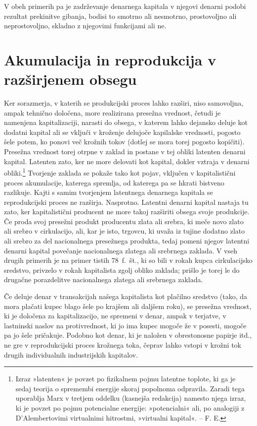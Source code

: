 \documentclass[kapital_02.tex]{subfiles}
\begin{document}
V obeh primerih pa je zadrževanje denarnega kapitala v njegovi denarni podobi rezultat prekinitve gibanja, bodisi to smotrno ali nesmotrno, prostovoljno ali neprostovoljno, skladno z njegovimi funkcijami ali ne.

\section{Akumulacija in reprodukcija v razširjenem obsegu}

Ker sorazmerja, v katerih se produkcijski proces lahko razširi, niso samovoljna, ampak tehnično določena, more realizirana presežna vrednost, četudi je namenjena kapitalizaciji, narasti do obsega, v katerem lahko dejansko deluje kot \KPEstran dodatni kapital ali se vključi v kroženje delujoče kapilalske vrednosti, pogosto šele potem, ko ponovi več krožnih tokov (dotlej se mora torej pogosto kopičiti). Presežna vrednost torej otrpne v zaklad in postane v tej obliki latenten denarni kapital. Latenten zato, ker ne more delovati kot kapital, dokler vztraja v denarni obliki.\footnote{Izraz »latenten« je povzet po fizikalnem pojmu latentne toplote, ki ga je sedaj teorija o spremembi energije skoraj popolnoma odpravila. Zaradi tega uporablja Marx v tretjem oddelku (kasnejša redakcija) namesto njega izraz, ki je povzet po pojmu potencialne energije: »potencialni« ali, po analogiji z D'Alembertovimi virtualnimi hitrostmi, »virtualni kapital«. -- F. E.} Tvorjenje zaklada se pokaže tako kot pojav, vključen v kapitalistični proces akumulacije, katerega spremlja, od katerega pa se hkrati bistveno razlikuje. Kajti s samim tvorjenjem latentnega denarnega kapitala se reprodukcijski proces ne razširja. Nasprotno. Latentni denarni kapital nastaja tu zato, ker kapitalistični producent ne more takoj razširiti obsega svoje produkcije. Če proda svoj presežni produkt producentu zlata ali srebra, ki meče novo zlato ali srebro v cirkulacijo, ali, kar je isto, trgovcu, ki uvaža iz tujine dodatno zlato ali srebro za del nacionalnega presežnega produkta, tedaj pomeni njegov latentni denarni kapital povečanje nacionalnega zlatega ali srebrnega zaklada. V vseh drugih primerih je na primer tistih 78~f.~št., ki so bili v rokah kupca cirkulacijsko sredstvo, privzelo v rokah kapitalista zgolj obliko zaklada; prišlo je torej le do drugačne porazdelitve nacionalnega zlatega ali srebrnega zaklada.

Če deluje denar v transakcijah našega kapitalista kot plačilno sredstvo (tako, da mora plačati kupec blago šele po krajšem ali daljšem roku), se presežna vrednost, ki je določena za kapitalizacijo, ne spremeni v denar, ampak v terjatve, v lastninski naslov na protivrednost, ki jo ima kupec mogoče že v posesti, mogoče pa jo šele pričakuje. Podobno kot denar, ki je naložen v obrestonosne papirje itd., ne gre v reprodukcijski proces krožnega toka, čeprav lahko vstopi v krožni tok drugih individualnih industrijskih kapitalov.
\end{document}

